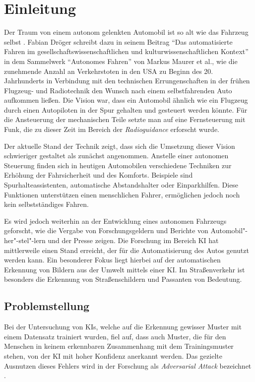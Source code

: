 \chapter{Einleitung}
\label{cha:Einleitung}
\setlength{\epigraphwidth}{4in}

Der Traum von einem autonom gelenkten Automobil ist so alt wie das Fahrzeug selbst \cite{maurer_autonomes_2015}. Fabian Dröger schreibt dazu in seinem Beitrag "`Das automatisierte Fahren im gesellschaftswissenschaftlichen und kulturwissenschaftlichen Kontext"' in dem Sammelwerk "`Autonomes Fahren"' von Markus Maurer et al., wie die zunehmende Anzahl an Verkehrstoten in den USA zu Beginn des 20. Jahrhunderts in Verbindung mit den technischen Errungenschaften in der frühen Flugzeug- und Radiotechnik den Wunsch nach einem selbstfahrenden Auto aufkommen ließen. Die Vision war, dass ein Automobil ähnlich wie ein Flugzeug durch einen Autopiloten in der Spur gehalten und gesteuert werden könnte. Für die Ansteuerung der mechanischen Teile setzte man auf eine Fernsteuerung mit Funk, die zu dieser Zeit im Bereich der \emph{Radioguidance} erforscht wurde.

Der aktuelle Stand der Technik zeigt, dass sich die Umsetzung dieser Vision schwieriger gestaltet als zunächst angenommen. Anstelle einer autonomen Steuerung finden sich in heutigen Automobilen verschiedene Techniken zur Erhöhung der Fahrsicherheit und des Komforts. Beispiele sind Spurhalteassistenten, automatische Abstandshalter oder Einparkhilfen. Diese Funktionen unterstützen einen menschlichen Fahrer, ermöglichen jedoch noch kein selbstständiges Fahren.

Es wird jedoch weiterhin an der Entwicklung eines autonomen Fahrzeugs geforscht, wie die Vergabe von Forschungsgeldern \cite{bmbf-internetredaktion_auto_nodate} und Berichte von Automobil"-her"-stel"-lern \cite{bmw_autonomes_nodate} und der Presse \cite{efler_autonomes_2018} zeigen. Die Forschung im Bereich \ac{KI} hat mittlerweile einen Stand erreicht, der für die Automatisierung des Autos genutzt werden kann. Ein besonderer Fokus liegt hierbei auf der automatischen Erkennung von Bildern aus der Umwelt mittels einer \ac{KI}. Im Straßenverkehr ist besonders die Erkennung von Straßenschildern und Passanten von Bedeutung.


\section{Problemstellung}
\label{sec:Problemstellung}
Bei der Untersuchung von \acp{KI}, welche auf die Erkennung gewisser Muster mit einem Datensatz trainiert wurden, fiel auf, dass auch Muster, die für den Menschen in keinem erkennbaren Zusammenhang mit dem Trainingsmuster stehen, von der \ac{KI} mit hoher Konfidenz anerkannt werden. Das gezielte Ausnutzen dieses Fehlers wird in der Forschung als \textit{Adversarial Attack} bezeichnet \cite{DBLP:journals/corr/HuangPGDA17}.

